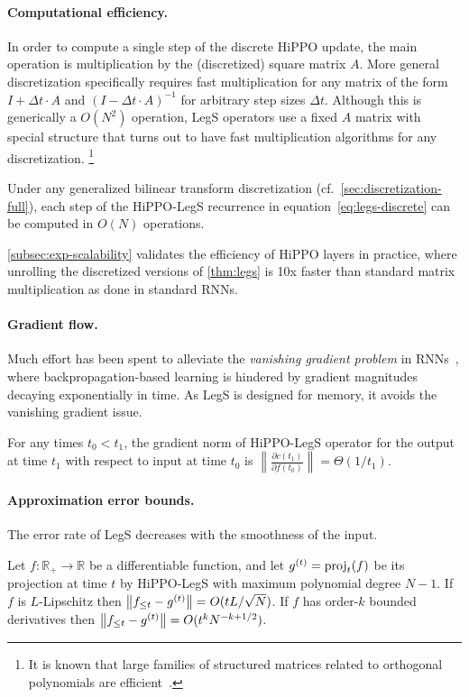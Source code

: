 \paragraph{Computational efficiency.}
In order to compute a single step of the discrete HiPPO update, the main operation is multiplication by the (discretized) square matrix $A$.
More general discretization specifically requires fast multiplication for any matrix of the form $I + \Delta t \cdot A$ and $(I - \Delta t \cdot A)^{-1}$ for arbitrary step sizes $\Delta t$.
Although this is generically a $O(N^2)$ operation, LegS operators use a fixed $A$ matrix with special structure
that turns out to have fast multiplication algorithms for any discretization.%
\footnote{It is known that large families of structured matrices related to orthogonal polynomials are efficient~\cite{de2018two}.}
\begin{proposition}%
    \label{prop:efficiency}
    Under any generalized bilinear transform discretization (cf.\
    \cref{sec:discretization-full}), each step of the HiPPO-LegS recurrence in equation~\eqref{eq:legs-discrete} can be computed in $O(N)$ operations.
\end{proposition}

\cref{subsec:exp-scalability} validates the efficiency of HiPPO layers in practice, where unrolling the discretized versions of \cref{thm:legs} is 10x faster than standard matrix multiplication as done in standard RNNs.

\paragraph{Gradient flow.}
Much effort has been spent to alleviate the \emph{vanishing gradient problem} in RNNs~\cite{pascanu2013difficulty},
where backpropagation-based learning is hindered by gradient magnitudes decaying exponentially in time.
As LegS is designed for memory, it avoids the vanishing gradient issue.
\begin{proposition}%
  \label{prop:gradient-bound}
    For any times $t_0 < t_1$, the gradient norm of HiPPO-LegS operator
    for the output at time $t_1$ with respect to input at time $t_0$ is
    $\left\| \frac{\partial c(t_1)}{\partial f(t_0)} \right\| = \Theta\left( 1/t_1 \right)$.
\end{proposition}


\paragraph{Approximation error bounds.}
The error rate of LegS decreases with the smoothness of the input.

\begin{proposition}%
  \label{prop:approximation_error}
  Let $f \colon \mathbb{R}_+ \to \mathbb{R}$ be a differentiable function, and let
  $g^{(t)} = \operatorname{proj}_t(f)$ be its projection at time $t$ by
  HiPPO-LegS with maximum polynomial degree $N-1$.
  If $f$ is $L$-Lipschitz then $\left\|{f_{\leq t} - g^{(t)}}\right\| = O(tL/\sqrt{N})$.
  If $f$ has order-$k$ bounded derivatives then
  $\left\|{f_{\leq t} - g^{(t)}}\right\| = O(t^k N^{-k+1/2})$.
\end{proposition}

